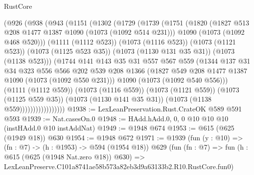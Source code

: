 \begin{lexlean}{RustCore}
\begin{coremodule}
                  (@926
                    (@938
                      (@943
                        (@1151
                          (@1302
                            (@1729
                              (@1739
                                (@1751
                                  (@1820
                                    (@1827 @513 @208 @1477 @1387 @1090 (@1073 (@1092 @514 @231)))
                                    @1090
                                    (@1073 (@1092 @468 @520)))
                                  (@1111 (@1112 @523))
                                  (@1073 (@1116 @523))
                                  (@1073 (@1121 @523))
                                  (@1073 (@1125 @523 @35))
                                  (@1073 (@1130 @131 @35 @31))
                                  (@1073 (@1138 @523)))
                                (@1744
                                  @141
                                  @143
                                  @35
                                  @31
                                  @557
                                  @567
                                  @559
                                  (@1344
                                    @137
                                    @31
                                    @34
                                    @323
                                    @556
                                    @566
                                    @202
                                    @539
                                    @208
                                    @1366
                                    (@1827 @549 @208 @1477 @1387 @1090 (@1073 (@1092 @550 @231)))
                                    @1090
                                    (@1073 (@1092 @540 @556)))
                                  (@1111 (@1112 @559))
                                  (@1073 (@1116 @559))
                                  (@1073 (@1121 @559))
                                  (@1073 (@1125 @559 @35))
                                  (@1073 (@1130 @141 @35 @31))
                                  (@1073 (@1138 @559)))))))))))))))))
@1938 := LexLeanPreservation.Rust.CrateOK @589 @591 @593
@1939 := Nat.casesOn.{0}
@1948 := HAdd.hAdd.{0, 0, 0} @10 @10 @10 (instHAdd.{0} @10 instAddNat)
@1949 := @1948 @674
@1953 := @615 (@625 (@1949 @18)) @630
@1954 := @1948 @672
@1971 := @1939
    (fun (y : @10) => (fn : @7) -> (h : @1953) -> @594 (@1954 @18))
    @629
    (fun (fn : @7) =>
    fun (h : @615 (@625 (@1948 Nat.zero @18)) @630) =>
    LexLeanPreserve.C101a8741ae58b573a82eb3d9a63133b2.R10.RustCore.fun0)

\end{coremodule}
\end{lexlean}
